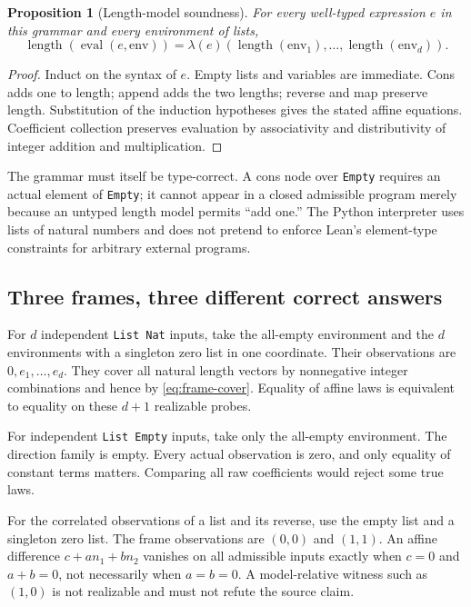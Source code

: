 \documentclass[11pt,a4paper]{article}
\newcommand{\code}[1]{\nolinkurl{#1}}
\theoremstyle{plain}
\newtheorem{proposition}[theorem]{Proposition}
\theoremstyle{definition}
\theoremstyle{remark}
\begin{document}
\begin{proposition}[Length-model soundness]\label{prop:lengthmodel}
For every well-typed expression $e$ in this grammar and every environment of lists,
\[
 \operatorname{length}(\operatorname{eval}(e,\text{env}))
 =\lambda(e)(\operatorname{length}(\text{env}_1),\ldots,
              \operatorname{length}(\text{env}_d)).
\]
\end{proposition}
\begin{proof}
Induct on the syntax of $e$. Empty lists and variables are immediate. Cons adds one to length; append adds the two lengths; reverse and map preserve length. Substitution of the induction hypotheses gives the stated affine equations. Coefficient collection preserves evaluation by associativity and distributivity of integer addition and multiplication.
\end{proof}
The grammar must itself be type-correct. A cons node over \code{Empty} requires an actual element of \code{Empty}; it cannot appear in a closed admissible program merely because an untyped length model permits ``add one.'' The Python interpreter uses lists of natural numbers and does not pretend to enforce Lean's element-type constraints for arbitrary external programs.

\subsection{Three frames, three different correct answers}
For $d$ independent \code{List Nat} inputs, take the all-empty environment and the $d$ environments with a singleton zero list in one coordinate. Their observations are $0,e_1,\ldots,e_d$. They cover all natural length vectors by nonnegative integer combinations and hence by \eqref{eq:frame-cover}. Equality of affine laws is equivalent to equality on these $d+1$ realizable probes.

For independent \code{List Empty} inputs, take only the all-empty environment. The direction family is empty. Every actual observation is zero, and only equality of constant terms matters. Comparing all raw coefficients would reject some true laws.

For the correlated observations of a list and its reverse, use the empty list and a singleton zero list. The frame observations are $(0,0)$ and $(1,1)$. An affine difference $c+a n_1+b n_2$ vanishes on all admissible inputs exactly when $c=0$ and $a+b=0$, not necessarily when $a=b=0$. A model-relative witness such as $(1,0)$ is not realizable and must not refute the source claim.
\end{document}
